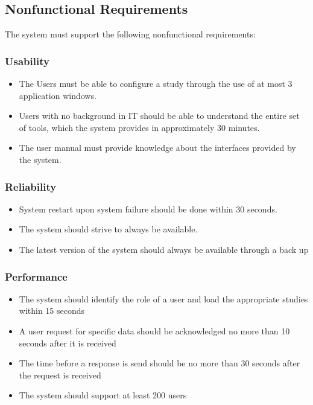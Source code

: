 \subsection{Nonfunctional Requirements}
The system must support the following nonfunctional requirements:

\subsubsection{Usability}

\begin{itemize}
\item The Users must be able to configure a study through the use of at most 3 application windows.
\item Users with no background in IT should be able to understand the entire set of tools, which the system provides in approximately 30 minutes. 
\item The user manual must provide knowledge about the interfaces provided by the system.
\end{itemize}

\subsubsection{Reliability}

\begin{itemize}
\item System restart upon system failure should be done within 30 seconds.
\item The system should strive to always be available. 
\item The latest version of the system should always be available through a back up
\end{itemize}

\subsubsection{Performance}

\begin{itemize}
\item The system should identify the role of a user and load the appropriate studies within 15 seconds
\item A user request for specific data should be acknowledged no more than 10 seconds after it is received
\item The time before a response is send should be no more than 30 seconds after the request is received
\item The system should support at least 200 users
\end{itemize}

